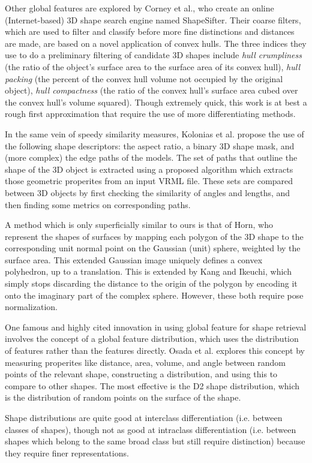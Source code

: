 \documentclass[../tech_report_1.tex]{subfiles}
\begin{document}
Other global features are explored by Corney et al.\cite{corney2002coarse}, who create an online (Internet-based) 3D shape search engine named ShapeSifter. Their coarse filters, which are used to filter and classify before more fine distinctions and distances are made, are based on a novel application of convex hulls. The three indices they use to do a preliminary filtering of candidate 3D shapes include \textit{hull crumpliness} (the ratio of the object's surface area to the surface area of its convex hull), \textit{hull packing} (the percent of the convex hull volume not occupied by the original object), \textit{hull compactness} (the ratio of the convex hull's surface area cubed over the convex hull's volume squared). Though extremely quick, this work is at best a rough first approximation that require the use of more differentiating methods.

In the same vein of speedy similarity measures, Kolonias et al.\cite{kolonias2005fast} propose the use of the following shape descriptors: the aspect ratio, a binary 3D shape mask, and (more complex) the edge paths of the models. The set of paths that outline the shape of the 3D object is extracted using a proposed algorithm which extracts those geometric properites from an input VRML file. These sets are compared between 3D objects by first checking the similarity of angles and lengths, and then finding some metrics on corresponding paths.

A method which is only superficially similar to ours is that of Horn\cite{horn1984extended}, who represent the shapes of surfaces by mapping each polygon of the 3D shape to the corresponding unit normal point on the Gaussian (unit) sphere, weighted by the surface area. This extended Gaussian image uniquely defines a convex polyhedron, up to a translation. This is extended by Kang and Ikeuchi\cite{kang1991determining}, which simply stops discarding the distance to the origin of the polygon by encoding it onto the imaginary part of the complex sphere. However, these both require pose normalization.

One famous and highly cited innovation in using global feature for shape retrieval involves the concept of a global feature distribution, which uses the distribution of features rather than the features directly. Osada et al.\cite{osada2002shape} explores this concept by measuring properites like distance, area, volume, and angle between random points of the relevant shape, constructing a distribution, and using this to compare to other shapes. The most effective is the D2 shape distribution, which is the distribution of random points on the surface of the shape.

Shape distributions are quite good at interclass differentiation (i.e. between classes of shapes), though not as good at intraclass differentiation\cite{tangelder2008survey} (i.e. between shapes which belong to the same broad class but still require distinction) because they require finer representations.
\end{document}
